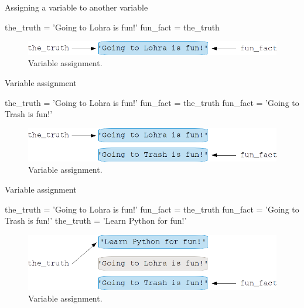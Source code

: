 \documentclass[
  american,
  ignorenonframetext,
]{beamer}
\begin{document}
\begin{frame}{Assigning a variable to another variable}
\protect\hypertarget{assigning-a-variable-to-another-variable}{}

\begin{pythoncode}

the_truth = 'Going to Lohra is fun!'
fun_fact = the_truth

\end{pythoncode}

\begin{figure}
\centering
\includegraphics{02_Variables_Assignments/var_assignment_02.png}
\caption{Variable assignment.}
\end{figure}

\end{frame}

\begin{frame}{Variable assignment}
\protect\hypertarget{variable-assignment-1}{}

\begin{pythoncode}

the_truth = 'Going to Lohra is fun!'
fun_fact = the_truth
fun_fact = 'Going to Trash is fun!'

\end{pythoncode}

\begin{figure}
\centering
\includegraphics{02_Variables_Assignments/var_assignment_03.png}
\caption{Variable assignment.}
\end{figure}

\end{frame}

\begin{frame}{Variable assignment}
\protect\hypertarget{variable-assignment-2}{}

\begin{pythoncode}

the_truth = 'Going to Lohra is fun!'
fun_fact = the_truth
fun_fact = 'Going to Trash is fun!'
the_truth = 'Learn Python for fun!'

\end{pythoncode}

\begin{figure}
\centering
\includegraphics{02_Variables_Assignments/var_assignment_04.png}
\caption{Variable assignment.}
\end{figure}

\end{frame}
\end{document}
